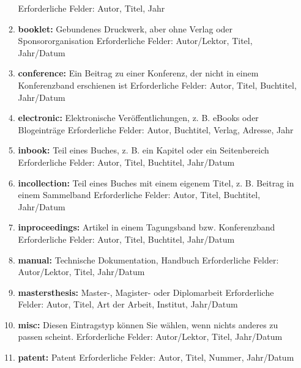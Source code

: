 \begin{enumerate}
\begin{enumerate}
        Erforderliche Felder: Autor, Titel, Jahr
        \item \textbf{booklet:} Gebundenes Druckwerk, aber ohne Verlag oder Sponsororganisation\newline
        Erforderliche Felder: Autor/Lektor, Titel, Jahr/Datum
        \item \textbf{conference:} Ein Beitrag zu einer Konferenz, der nicht in einem Konferenzband erschienen ist\newline
        Erforderliche Felder: Autor, Titel, Buchtitel, Jahr/Datum
        \item \textbf{electronic:} Elektronische Veröffentlichungen, z. B. eBooks oder Blogeinträge\newline 
        Erforderliche Felder: Autor, Buchtitel, Verlag, Adresse, Jahr
        \item \textbf{inbook:} Teil eines Buches, z. B. ein Kapitel oder ein Seitenbereich\newline
        Erforderliche Felder: Autor, Titel, Buchtitel, Jahr/Datum 
        \item \textbf{incollection:} Teil eines Buches mit einem eigenem Titel, z. B. Beitrag in einem Sammelband\newline
        Erforderliche Felder: Autor, Titel, Buchtitel, Jahr/Datum
        \item \textbf{inproceedings:} Artikel in einem Tagungsband bzw. Konferenzband\newline
        Erforderliche Felder: Autor, Titel, Buchtitel, Jahr/Datum
        \item \textbf{manual:} Technische Dokumentation, Handbuch\newline
        Erforderliche Felder: Autor/Lektor, Titel, Jahr/Datum
        \item \textbf{mastersthesis:} Master-, Magister- oder Diplomarbeit\newline
        Erforderliche Felder: Autor, Titel, Art der Arbeit, Institut, Jahr/Datum
        \item \textbf{misc:} Diesen Eintragstyp können Sie wählen, wenn nichts anderes zu passen scheint. \newline
        Erforderliche Felder: Autor/Lektor, Titel, Jahr/Datum
        \item \textbf{patent:} Patent\newline 
        Erforderliche Felder: Autor, Titel, Nummer, Jahr/Datum

\end{enumerate}
\end{enumerate}
